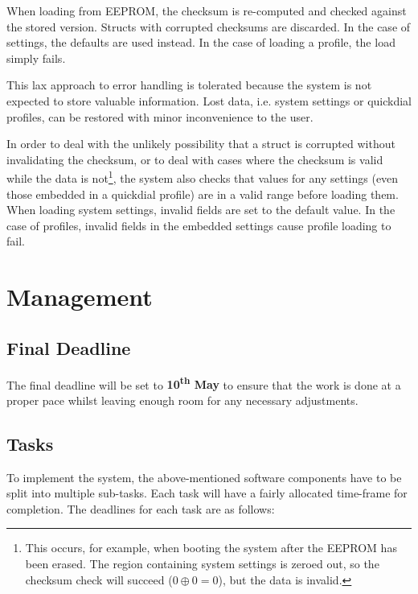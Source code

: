 \documentclass[11pt,a4paper,twocolumn]{scrartcl}
\begin{document}
When loading from EEPROM, the checksum is re-computed and checked against the stored version. Structs with corrupted checksums are discarded. In the case of settings, the defaults are used instead. In the case of loading a profile, the load simply fails.

This lax approach to error handling is tolerated because the system is not expected to store valuable information. Lost data, i.e. system settings or quickdial profiles, can be restored with minor inconvenience to the user.

In order to deal with the unlikely possibility that a struct is corrupted without invalidating the checksum, or to deal with cases where the checksum is valid while the data is not\footnote{This occurs, for example, when booting the system after the EEPROM has been erased. The region containing system settings is zeroed out, so the checksum check will succeed ($0 \oplus 0 = 0$), but the data is invalid.}, the system also checks that values for any settings (even those embedded in a quickdial profile) are in a valid range before loading them. When loading system settings, invalid fields are set to the default value. In the case of profiles, invalid fields in the embedded settings cause profile loading to fail.

\section{Management} \label{schedule}
\subsection{Final Deadline}
The final deadline will be set to \textbf{10\textsuperscript{th} May} to ensure that the work is done at a proper pace whilst leaving enough room for any necessary 
adjustments.

\subsection{Tasks}
To implement the system, the above-mentioned software components have to be split into multiple sub-tasks. Each task will have a fairly allocated time-frame for completion. The deadlines for each task are as follows:
\end{document}
